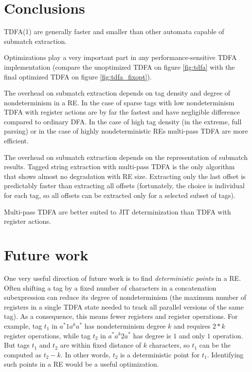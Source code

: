 \documentclass[]{article}
\begin{document}
\section{Conclusions}\label{section_conclusions}

TDFA(1) are generally faster and smaller than other automata capable of submatch extraction.
\medskip

Optimizations play a very important part in any performance-sensitive TDFA implementation
(compare the unoptimized TDFA on figure \ref{fig:tdfa} with the final optimized TDFA on figure \ref{fig:tdfa_fixopt}).
\medskip

The overhead on submatch extraction depends on tag density and degree of nondeterminism in a RE.
In the case of sparse tags with low nondeterminism TDFA with register actions are by far the fastest and have negligible difference compared to ordinary DFA.
In the case of high tag density (in the extreme, full parsing) or in the case of highly nondeterministic REs
multi-pass TDFA are more efficient.
\medskip

The overhead on submatch extraction depends on the representation of submatch results.
Tagged string extraction with multi-pass TDFA is the only algorithm that shows almost no degradation with RE size.
Extracting only the last offset is predictably faster than extracting all offsets
(fortunately, the choice is individual for each tag, so all offsets can be extracted only for a selected subset of tags).
\medskip

Multi-pass TDFA are better suited to JIT determinization than TDFA with register actions.
\medskip

\section{Future work}\label{section_future_work}

One very useful direction of future work is to find \emph{deterministic points} in a RE.
Often shifting a tag by a fixed number of characters in a concatenation subexpression can reduce its degree of nondeterminism
(the maximum number of registers in a single TDFA state needed to track all parallel versions of the same tag).
As a consequence, this means fewer registers and register operations.
For example, tag $t_1$ in $a^* 1 a^k a^*$ has nondeterminism degree $k$ and requires $2*k$ register operations,
while tag $t_2$ in $a^* a^k 2 a^*$ has degree is $1$ and only $1$ operation.
But tags $t_1$ and $t_2$ are within fixed distance of $k$ characters, so $t_1$ can be the computed as $t_2 - k$.
In other words, $t_2$ is a deterministic point for $t_1$.
Identifying such points in a RE would be a useful optimization.
\end{document}
